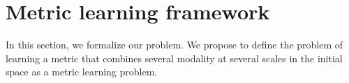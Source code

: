 %


\section{Metric learning framework}
In this section, we formalize our problem. We propose to define the problem of learning a metric that combines several modality at several scales in the initial space as a metric learning problem.

